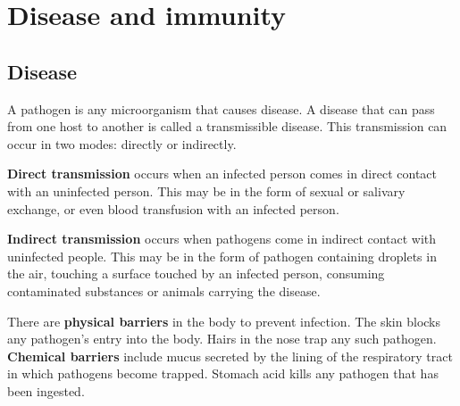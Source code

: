 \section{Disease and immunity}
\subsection{Disease}
A pathogen is any microorganism that causes disease. A disease that can pass from one host to 
another is called a transmissible disease. This transmission can occur in two modes: directly or
indirectly.

\textbf{Direct transmission} occurs when an infected person comes in direct contact with an 
uninfected person. This may be in the form of sexual or salivary exchange, or even blood 
transfusion with an infected person.

\textbf{Indirect transmission} occurs when pathogens come in indirect contact with uninfected 
people. This may be in the form of pathogen containing droplets in the air, touching a surface
touched by an infected person, consuming contaminated substances or animals carrying the disease.

There are \textbf{physical barriers} in the body to prevent infection. The skin blocks any 
pathogen's entry into the body. Hairs in the nose trap any such pathogen. \textbf{Chemical barriers}
include mucus secreted by the lining of the respiratory tract in which pathogens become trapped.
Stomach acid kills any pathogen that has been ingested.
